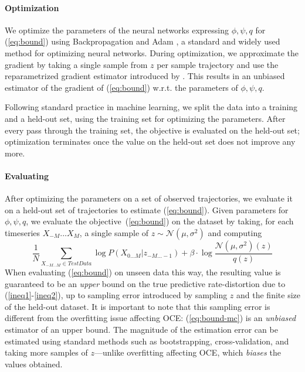 \documentclass[11pt,letterpaper]{article}
\begin{document}
\paragraph{Optimization}
We optimize the parameters of the neural networks expressing $\phi, \psi, q$ for (\ref{eq:bound}) using Backpropagation and Adam \citep{kingma-adam:-2014}, a standard and widely used method for optimizing neural networks.
During optimization, we approximate the gradient by taking a single sample from $z$ per sample trajectory and use the reparametrized gradient estimator introduced by \citet{kingma-auto-encoding-2014}.
This results in an unbiased estimator of the gradient of (\ref{eq:bound}) w.r.t. the parameters of $\phi, \psi, q$.

Following standard practice in machine learning, we split the data into a training and a held-out set, using the training set for optimizing the parameters.
After every pass through the training set, the objective is evaluated on the held-out set; optimization terminates once the value on the held-out set does not improve any more.


\paragraph{Evaluating}
After optimizing the parameters on a set of observed trajectories, we evaluate it on a held-out set of trajectories to estimate (\ref{eq:bound}).
Given parameters for $\phi, \psi, q$, we evaluate the objective~(\ref{eq:bound}) on the dataset by taking, for each timeseries $X_{-M}...X_M$, a single sample of $z  \sim \mathcal{N}(\mu, \sigma^2)$ and computing
\begin{equation}\label{eq:bound-mc}
	\frac{1}{N}	\sum_{X_{-M...M} \in TestData}	\log P(X_{0\dots M} | z_{-M...-1}) + \beta \cdot \log \frac{\mathcal{N}(\mu, \sigma^2)(z)}{q(z)}
\end{equation}
When evaluating (\ref{eq:bound}) on unseen data this way, the resulting value is guaranteed to be an \emph{upper} bound on the true predictive rate-distortion due to (\ref{ineq1}-\ref{ineq2}), up to sampling error introduced by sampling $z$ and the finite size of the held-out dataset.
It is important to note that this sampling error is different from the overfitting issue affecting OCE: 
(\ref{eq:bound-mc}) is an \emph{unbiased} estimator of an upper bound.
The magnitude of the estimation error can be estimated using standard methods such as bootstrapping, cross-validation, and taking more samples of $z$---unlike overfitting affecting OCE, which \emph{biases} the values obtained.
\end{document}
